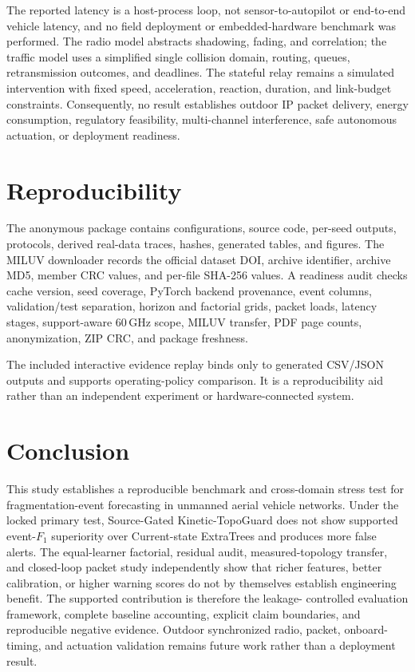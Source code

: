 \documentclass[final,5p,times,twocolumn]{elsarticle}
\newcommand{\SI}[2]{#1\,\ensuremath{\mathrm{#2}}}
\begin{document}
The reported latency is a host-process loop, not sensor-to-autopilot or end-to-end vehicle
latency, and no field deployment or embedded-hardware benchmark was performed. The radio
model abstracts shadowing, fading, and correlation; the traffic model uses a simplified
single collision domain, routing, queues, retransmission outcomes, and deadlines. The
stateful relay remains a simulated intervention with fixed speed, acceleration, reaction,
duration, and link-budget constraints. Consequently, no result establishes outdoor IP
packet delivery, energy consumption, regulatory feasibility, multi-channel interference,
safe autonomous actuation, or deployment readiness.

\section{Reproducibility}

The anonymous package contains configurations, source code, per-seed outputs, protocols,
derived real-data traces, hashes, generated tables, and figures. The MILUV downloader
records the official dataset DOI, archive identifier, archive MD5, member CRC values, and
per-file SHA-256 values. A readiness audit checks cache version, seed coverage, PyTorch
backend provenance, event columns, validation/test separation, horizon and factorial
grids, packet loads, latency stages, support-aware \SI{60}{GHz} scope, MILUV transfer,
PDF page counts, anonymization, ZIP CRC, and package freshness.

The included interactive evidence replay binds only to generated CSV/JSON outputs and
supports operating-policy comparison. It is a reproducibility aid rather than an
independent experiment or hardware-connected system.

\section{Conclusion}

This study establishes a reproducible benchmark and cross-domain stress test for
fragmentation-event forecasting in unmanned aerial vehicle networks. Under the locked
primary test, Source-Gated Kinetic-TopoGuard does not show supported event-$F_1$ superiority
over Current-state ExtraTrees and produces more false alerts. The equal-learner factorial,
residual audit, measured-topology transfer, and closed-loop packet study independently show
that richer features, better calibration, or higher warning scores do not by themselves
establish engineering benefit. The supported contribution is therefore the leakage-
controlled evaluation framework, complete baseline accounting, explicit claim boundaries,
and reproducible negative evidence. Outdoor synchronized radio, packet, onboard-timing,
and actuation validation remains future work rather than a deployment result.
\end{document}
